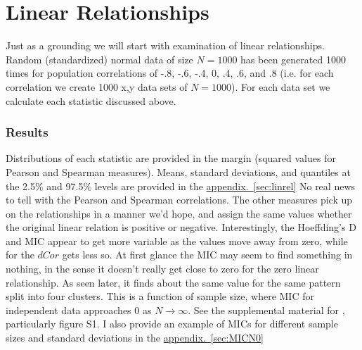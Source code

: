 \documentclass[english,nohyper,titlepage]{tufte-handout}\usepackage{graphicx, color}
\begin{document}
\part{Linear Relationships} %

Just as a grounding we will start with examination of linear relationships.  Random (standardized) normal data of size $N = 1000$ has been generated 1000 times for population correlations of -.8, -.6, -.4, 0, .4, .6, and .8 (i.e. for each correlation we create 1000 x,y data sets of $N = 1000$).  For each data set we calculate each statistic discussed above.

\section{Results}
Distributions of each statistic are provided in the margin (squared values for Pearson and Spearman measures). Means, standard deviations, and quantiles at the 2.5\% and 97.5\% levels are provided in the \hyperref[sec:linrel]{appendix.~\ref*{sec:linrel}} No real news to tell with the Pearson and Spearman correlations.  The other measures pick up on the relationships in a manner we'd hope, and assign the same values whether the original linear relation is positive or negative. Interestingly, the Hoeffding's D and MIC appear to get more variable as the values move away from zero, while for the $dCor$ gets less so.  At first glance  the MIC may seem to find something in nothing, in the sense it doesn't really get close to zero for the zero linear relationship.  As seen later, it finds about the same value for the same pattern split into four clusters.  This is a function of sample size, where MIC for independent data approaches  0  as $N\rightarrow\infty$.  See the supplemental material for \citet{reshef_detecting_2011}, particularly figure S1.  I also provide an example of MICs for different sample sizes and standard deviations in the \hyperref[sec:MICN0]{appendix.~\ref*{sec:MICN0}}
\end{document}
